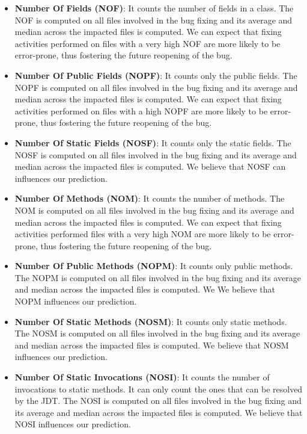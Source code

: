 \documentclass[sigconf,review]{acmart}
\begin{document}
\begin{itemize}
\item{\textbf{Number Of Fields (NOF)}: It counts the number of fields in a class. The NOF is computed on all files involved in the bug fixing and its average and median across the impacted files is computed. We can expect that fixing activities performed on files with a very high NOF are more likely to be error-prone, thus fostering the future reopening of the bug.
}

\item{\textbf{Number Of Public Fields (NOPF)}: It counts only the public fields. The NOPF is computed on all files involved in the bug fixing and its average and median across the impacted files is computed. We can expect that fixing activities performed on files with a high NOPF are more likely to be error-prone, thus fostering the future reopening of the bug.
}

\item{\textbf{Number Of Static Fields (NOSF)}: It counts only the static fields. The NOSF is computed on all files involved in the bug fixing and its average and median across the impacted files is computed. We believe that NOSF can influences our prediction.
}

\item{\textbf{Number Of Methods (NOM)}: It counts the number of methods. The NOM is computed on all files involved in the bug fixing and its average and median across the impacted files is computed. We can expect that fixing activities performed files with a very high NOM are more likely to be error-prone, thus fostering the future reopening of the bug.
}

\item{\textbf{Number Of Public Methods (NOPM)}: It counts only public methods. The NOPM is computed on all files involved in the bug fixing and its average and median across the impacted files is computed. We We believe that NOPM influences our prediction.
}

\item{\textbf{Number Of Static Methods (NOSM)}: It counts only static methods. The NOSM is computed on all files involved in the bug fixing and its average and median across the impacted files is computed. We believe that NOSM influences our prediction.
}

\item{\textbf{Number Of Static Invocations (NOSI)}: It counts the number of invocations to static methods. It can only count the ones that can be resolved by the JDT. The NOSI is computed on all files involved in the bug fixing and its average and median across the impacted files is computed. We believe that NOSI influences our prediction.
}


\end{itemize}
\end{document}
